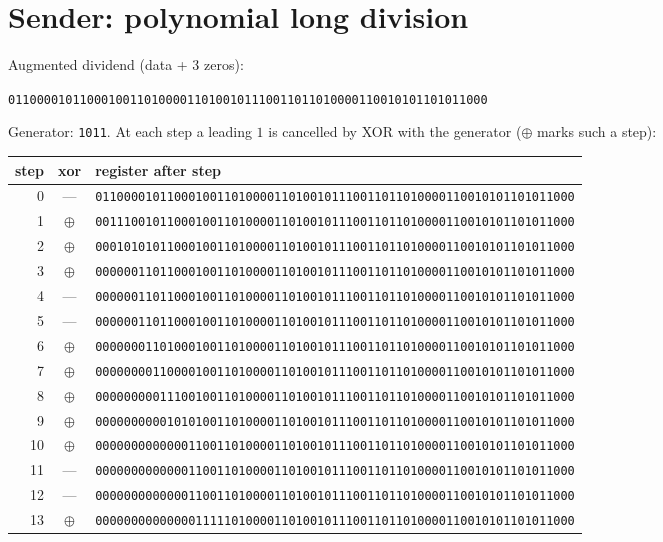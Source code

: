 \documentclass[11pt,a4paper]{article}
\begin{document}
\section{Sender: polynomial long division}
Augmented dividend (data + 3 zeros):
\begin{center}\texttt{0110000101100010011010000110100101110011011010000110010101101011000}\end{center}
Generator: \texttt{1011}. At each step a leading $1$ is cancelled by XOR with the generator ($\oplus$ marks such a step):
\begin{center}
\footnotesize
\begin{tabular}{rcl}
\toprule
step & xor & register after step \\
\midrule
    0 & --- & \texttt{0110000101100010011010000110100101110011011010000110010101101011000} \\
    1 & $\oplus$ & \texttt{0011100101100010011010000110100101110011011010000110010101101011000} \\
    2 & $\oplus$ & \texttt{0001010101100010011010000110100101110011011010000110010101101011000} \\
    3 & $\oplus$ & \texttt{0000001101100010011010000110100101110011011010000110010101101011000} \\
    4 & --- & \texttt{0000001101100010011010000110100101110011011010000110010101101011000} \\
    5 & --- & \texttt{0000001101100010011010000110100101110011011010000110010101101011000} \\
    6 & $\oplus$ & \texttt{0000000110100010011010000110100101110011011010000110010101101011000} \\
    7 & $\oplus$ & \texttt{0000000011000010011010000110100101110011011010000110010101101011000} \\
    8 & $\oplus$ & \texttt{0000000001110010011010000110100101110011011010000110010101101011000} \\
    9 & $\oplus$ & \texttt{0000000000101010011010000110100101110011011010000110010101101011000} \\
    10 & $\oplus$ & \texttt{0000000000000110011010000110100101110011011010000110010101101011000} \\
    11 & --- & \texttt{0000000000000110011010000110100101110011011010000110010101101011000} \\
    12 & --- & \texttt{0000000000000110011010000110100101110011011010000110010101101011000} \\
    13 & $\oplus$ & \texttt{0000000000000011111010000110100101110011011010000110010101101011000} \\

\end{tabular}
\end{center}
\end{document}
